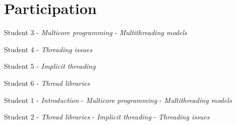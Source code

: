 \documentclass[a4paper,11pt]{article}
\begin{document}
\newpage\section*{Participation}
\begin{description}
    \item[Presentation:]
    \item Student 3
        \subitem - \emph{Multicore programming}
        \subitem - \emph{Multithreading models}
    \item Student 4
        \subitem - \emph{Threading issues}
    \item Student 5
        \subitem - \emph{Implicit threading}
    \item Student 6
        \subitem - \emph{Thread libraries}
    \item[Report:]
    \item Student 1
        \subitem - \emph{Introduction}
        \subitem - \emph{Multicore programming}
        \subitem - \emph{Multithreading models}
    \item Student 2
        \subitem - \emph{Thread libraries}
        \subitem - \emph{Implicit threading}
        \subitem - \emph{Threading issues}
\end{description}

\newpage 

\end{document}

